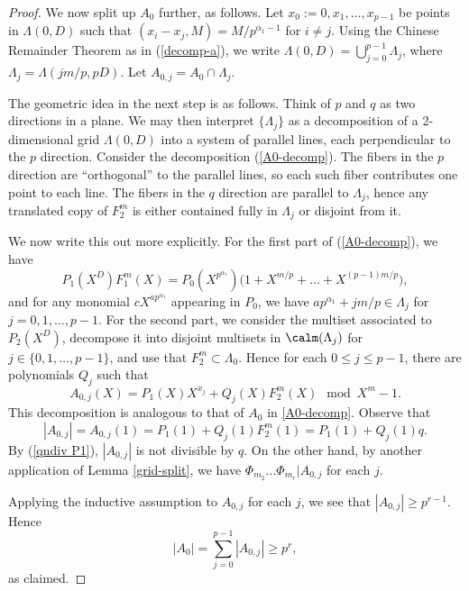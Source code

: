 \begin{proof}
We now split up $A_0$ further, as follows. 
Let $x_0:=0,x_1,\dots,x_{p-1}$ be points in $\Lambda(0, D)$ such that $(x_i-x_j,M)=M/p^{\alpha_1-1}$ for $i\neq j$.
Using the Chinese Remainder Theorem as in (\ref{decomp-a}), we write 
$\Lambda(0, D)=\bigcup_{j=0}^{p-1}\Lambda_j$, where $\Lambda_j=\Lambda(jm/p,pD)$. Let
$A_{0,j}=A_0\cap\Lambda_j$.

The geometric idea in the next step is as follows. Think of $p$ and $q$ as two directions in a plane. We may then interpret $\{\Lambda_j\}$ as a decomposition of a 2-dimensional grid $\Lambda(0,D)$ into a system of parallel lines, each perpendicular to the $p$ direction. 
Consider the decomposition (\ref{A0-decomp}). The fibers in the $p$ direction are ``orthogonal'' to the parallel lines, so each such fiber contributes one point to each line. The fibers in the $q$ direction are parallel to $\Lambda_j$, hence any translated copy of $F^{m}_2$ is either contained fully in $\Lambda_j$ or disjoint from it.

We now write this out more explicitly. For the first part of (\ref{A0-decomp}), we have
$$
P_1(X^D)F^{m}_1(X)= P_0(X^{p^{\alpha_1}}) \Big(1+X^{m/p}+\dots +X^{(p-1)m/p}\Big),
$$
and for any monomial $cX^{ap^{\alpha_1}}$ appearing in $P_0$, we have 
$ap^{\alpha_1}+ jm/p \in \Lambda_j$ for $j=0,1,\dots,p-1$. For the second part, we consider the multiset associated to $P_2(X^D)$, decompose it into disjoint multisets in $\calm(\Lambda_j)$ for $j\in\{0,1,\dots,p-1\}$, and use that $F^m_2\subset \Lambda_0$. Hence for each $0 \leq j \leq p - 1$, there are polynomials $Q_j$ such that
$$
A_{0,j}(X)=P_1(X) X^{x_j} + Q_j (X) F^{m}_2(X) \mod X^{m}-1.
$$
This decomposition is analogous to that of $A_0$ in \eqref{A0-decomp}.
Observe that
$$
|A_{0,j}|=A_{0,j}(1)=P_1(1) + Q_j(1)F^m_2(1)= P_1(1) + Q_j(1)q.
$$
By (\ref{qndiv P1}), $|A_{0,j}|$ is not divisible by $q$.
On the other hand, by another application of Lemma \ref{grid-split}, we have $\Phi_{m_2}\dots \Phi_{m_r}|A_{0,j}$ for each $j$. 

Applying the inductive assumption to $A_{0,j}$ for each $j$, we see that $|A_{0,j}|\geq p^{r-1}$. Hence
$$
|A_0|=\sum_{j=0}^{p-1}|A_{0,j}|\geq p^r,
$$
as claimed.
\end{proof}
